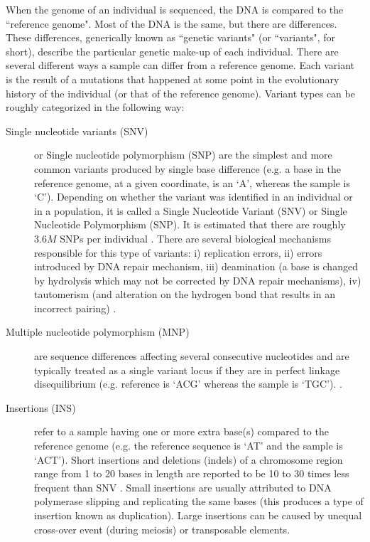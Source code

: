 When the genome of an individual is sequenced, the DNA is compared to the ``reference genome". Most of the DNA is the same, but there are differences. These differences, generically known as ``genetic variants" (or ``variants", for short), describe the particular genetic make-up of each individual. There are several different ways a sample can differ from a reference genome. Each variant is the result of a mutations that happened at some point in the evolutionary history of the individual (or that of the reference genome). Variant types can be roughly categorized in the following way:

\begin{description}

	\item[Single nucleotide variants (SNV)] or Single nucleotide polymorphism (SNP) are the simplest and more common variants produced by single base difference (e.g. a base in the reference genome, at a given coordinate,  is an `A', whereas the sample is `C'). Depending on whether the variant was identified in an individual or in a population, it is called a Single Nucleotide Variant (SNV) or Single Nucleotide Polymorphism (SNP). It is estimated that there are roughly $3.6M$ SNPs per individual \cite{10002012integrated}. There are several biological mechanisms responsible for this type of variants: i) replication errors, ii) errors introduced by DNA repair mechanism, iii) deamination (a base is changed by hydrolysis which may not be corrected by DNA repair mechanisms), iv) tautomerism (and alteration on the hydrogen bond that results in an incorrect pairing) \cite{griffiths2005introduction}.

	\item[Multiple nucleotide polymorphism (MNP)] are sequence differences affecting several consecutive nucleotides and are typically treated as a single variant locus if they are in perfect linkage disequilibrium (e.g. reference is ‘ACG’ whereas the sample is ‘TGC’). .

	\item[Insertions (INS)] refer to a sample having one or more extra base(s) compared to the reference genome (e.g. the reference sequence is ‘AT’ and the sample is ‘ACT’). Short insertions and deletions (indels) of a chromosome region range from 1 to 20 bases in length are reported to be 10 to 30 times less frequent than SNV \cite{10002012integrated}. Small insertions are usually attributed to DNA polymerase slipping and replicating the same bases (this produces a type of insertion known as duplication). Large insertions can be caused by unequal cross-over event (during meiosis) or transposable elements.


\end{description}
